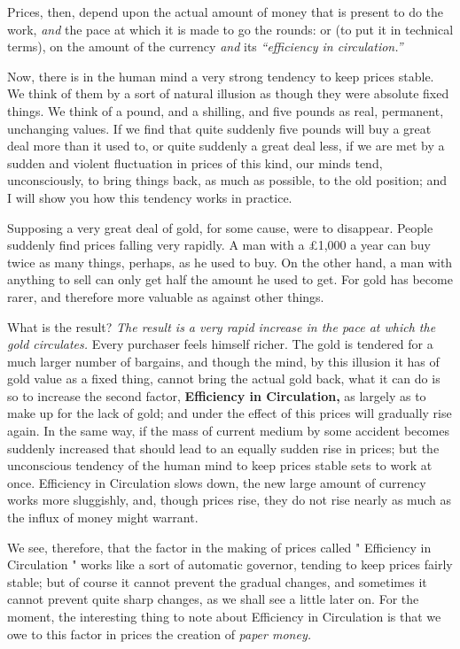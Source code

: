 \documentclass{book}
\begin{document}
Prices, then, depend upon the actual amount of money that is present to do the work, \emph{and} the pace at which it is made to go the rounds: or (to put it in technical terms), on the amount of the currency \emph{and} its \emph{“efficiency in circulation.”}

Now, there is in the human mind a very strong tendency to keep prices stable. We think of them by a sort of natural illusion as though they were absolute fixed things. We think of a pound, and a shilling, and five pounds as real, permanent, unchanging values. If we find that quite suddenly five pounds will buy a great deal more than it used to, or quite suddenly a great deal less, if we are met by a sudden and violent fluctuation in prices of this kind, our minds tend, unconsciously, to bring things back, as much as possible, to the old position; and I will show you how this tendency works in practice.

Supposing a very great deal of gold, for some cause, were to disappear. People suddenly find prices falling very rapidly. A man with a £1,000 a year can buy twice as many things, perhaps, as he used to buy. On the other hand, a man with anything to sell can only get half the amount he used to get. For gold has become rarer, and therefore more valuable as against other things.

What is the result? \emph{The result is a very rapid increase in the pace at which the gold circulates.} Every purchaser feels himself richer. The gold is tendered for a much larger number of bargains, and though the mind, by this illusion it has of gold value as a fixed thing, cannot bring the actual gold back, what it can do is so to increase the second factor, \textbf{Efficiency in Circulation,} as largely as to make up for the lack of gold; and under the effect of this prices will gradually rise again. In the same way, if the mass of current medium by some accident becomes suddenly increased that should lead to an equally sudden rise in prices; but the unconscious tendency of the human mind to keep prices stable sets to work at once. Efficiency in Circulation slows down, the new large amount of currency works more sluggishly, and, though prices rise, they do not rise nearly as much as the influx of money might warrant.

We see, therefore, that the factor in the making of prices called " Efficiency in Circulation " works like a sort of automatic governor, tending to keep prices fairly stable; but of course it cannot prevent the gradual changes, and sometimes it cannot prevent quite sharp changes, as we shall see a little later on. For the moment, the interesting thing to note about Efficiency in Circulation is that we owe to this factor in prices the creation of \emph{paper money.}
\end{document}

